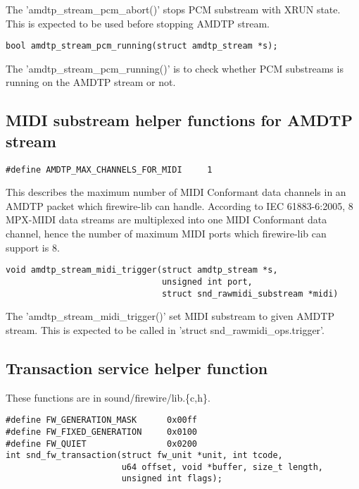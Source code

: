 \documentclass[onecolumn]{article}
\begin{document}
The 'amdtp\_stream\_pcm\_abort()' stops PCM substream with XRUN state. This is expected to be used before stopping AMDTP stream.

\begin{verbatim}
bool amdtp_stream_pcm_running(struct amdtp_stream *s);
\end{verbatim}

The 'amdtp\_stream\_pcm\_running()' is to check whether PCM substreams is running on the AMDTP stream or not.


\subsection{MIDI substream helper functions for AMDTP stream}

\begin{verbatim}
#define AMDTP_MAX_CHANNELS_FOR_MIDI     1
\end{verbatim}

This describes the maximum number of MIDI Conformant data channels in an AMDTP packet which firewire-lib can handle. According to IEC 61883-6:2005, 8 MPX-MIDI data streams are multiplexed into one MIDI Conformant data channel, hence the number of maximum MIDI ports which firewire-lib can support is 8.

\begin{verbatim}
void amdtp_stream_midi_trigger(struct amdtp_stream *s,
                               unsigned int port,
                               struct snd_rawmidi_substream *midi)
\end{verbatim}

The 'amdtp\_stream\_midi\_trigger()' set MIDI substream to given AMDTP stream. This is expected to be called in 'struct snd\_rawmidi\_ops.trigger'.


\subsection{Transaction service helper function}

These functions are in sound/firewire/lib.\{c,h\}.

\begin{verbatim}
#define FW_GENERATION_MASK      0x00ff
#define FW_FIXED_GENERATION     0x0100
#define FW_QUIET                0x0200
int snd_fw_transaction(struct fw_unit *unit, int tcode,
                       u64 offset, void *buffer, size_t length,
                       unsigned int flags);
\end{verbatim}
\end{document}
